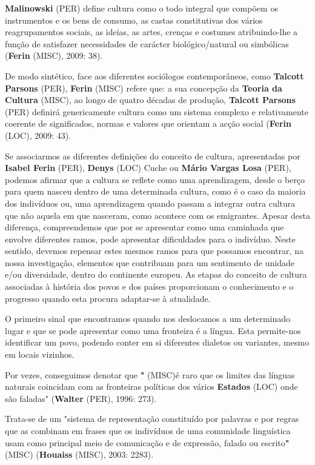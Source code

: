 \documentclass[12pt,a4paper]{article}
\begin{document}
\textbf{Malinowski} (PER) define cultura como o todo integral que compõem os instrumentos e os bens de consumo, as castas constitutivas dos vários reagrupamentos sociais, as ideias, as artes, crenças  e  costumes  atribuindo-lhe  a  função  de  satisfazer  necessidades  de  carácter biológico/natural ou simbólicas (\textbf{Ferin} (MISC), 2009: 38).

De modo sintético, face aos diferentes sociólogos contemporâneos, como \textbf{Talcott Parsons} (PER), \textbf{Ferin} (MISC) refere que: a sua concepção da \textbf{Teoria da Cultura} (MISC), ao longo de quatro décadas de produção, \textbf{Talcott Parsons} (PER)  definirá  genericamente  cultura  como  um  sistema  complexo  e  relativamente coerente de significados, normas e valores que orientam a acção social (\textbf{Ferin} (LOC), 2009: 43).

Se associarmos as diferentes definições do conceito de cultura, apresentadas por \textbf{Isabel  Ferin} (PER),  \textbf{Denys} (LOC)  Cuche  ou  \textbf{Mário  Vargas  Losa} (PER),  podemos  afirmar  que  a  cultura  se reflete  como  uma  aprendizagem,  desde  o  berço  para  quem  nasceu  dentro  de  uma determinada  cultura,  como  é  o  caso  da  maioria  dos  indivíduos  ou,  uma  aprendizagem quando passam a integrar outra cultura que não aquela em que nasceram, como acontece com os emigrantes. Apesar desta diferença, compreendemos que por se apresentar como uma  caminhada  que  envolve  diferentes  ramos,  pode  apresentar  dificuldades  para  o indivíduo.  Neste  sentido,  devemos  repensar  estes  mesmos  ramos  para  que  possamos encontrar,  na  nossa  investigação,  elementos  que  contribuam  para  um  sentimento  de unidade e/ou diversidade, dentro do continente europeu. As etapas do conceito de cultura associadas à história dos povos e dos países proporcionam o conhecimento e o progresso quando esta procura adaptar-se à atualidade.

O primeiro sinal que encontramos quando nos deslocamos a um determinado lugar e que se pode apresentar como uma fronteira é a língua. Esta permite-nos identificar um povo, podendo conter em si diferentes dialetos ou variantes, mesmo em locais vizinhos.

Por vezes, conseguimos denotar que \textbf{"} (MISC)é raro que os limites das línguas naturais coincidam com  as  fronteiras  políticas  dos  vários  \textbf{Estados} (LOC)  onde  são  faladas"  (\textbf{Walter} (PER),  1996:  273).

Trata-se de  um  "sistema de representação constituído  por palavras e por  regras que  as combinam  em  frases  que  os  indivíduos  de  uma  comunidade  linguística  usam  como principal meio de comunicação e de expressão, falado ou escrito\textbf{"} (MISC) (\textbf{Houaiss} (MISC), 2003: 2283).
\end{document}
